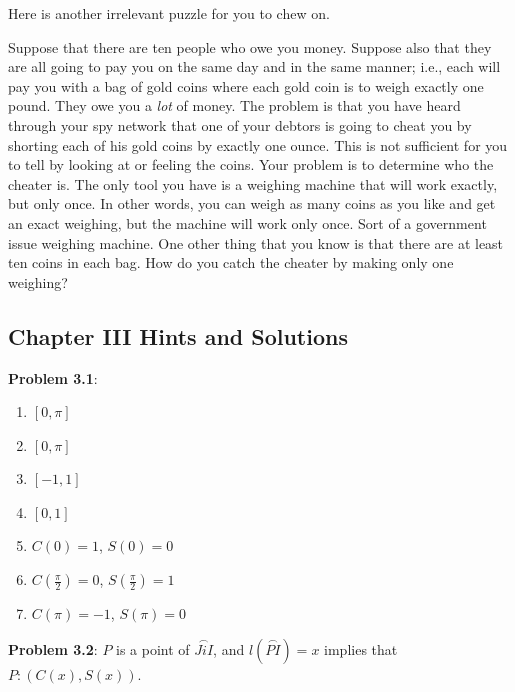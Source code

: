\documentclass[english]{book}
\newcommand{\arc}[1]{\overset{\frown}{#1} }
\begin{document}
\vspace{0.3cm}

Here is another irrelevant puzzle for you to chew on.

Suppose that there are ten people who owe you money. Suppose also that they are all going to pay you on the same day and in the same manner; i.e., each will pay you with a bag of gold coins where each gold coin is to weigh exactly one pound. They owe you a \emph{lot} of money. The problem is that you have heard through your spy network that one of your debtors is going to cheat you by shorting each of his gold coins by exactly one ounce. This is not sufficient for you to tell by looking at or feeling the coins. Your problem is to determine who the cheater is. The only tool you have is a weighing machine that will work exactly, but only once. In other words, you can weigh as many coins as you like and get an exact weighing, but the machine will work only once. Sort of a government issue weighing machine. One other thing that you know is that there are at least ten coins in each bag. How do you catch the cheater by making only one weighing?



\newpage
\begin{center}
\section*{Chapter III Hints and Solutions}
\end{center}


\textbf{Problem 3.1}:
\begin{enumerate}[\hspace{1cm}a)]
  \item $[0, \pi]$
  \item $[0, \pi]$
  \item $[-1, 1]$
  \item $[0,1]$
  \item $C(0) = 1$, $S(0) = 0$
  \item $C(\frac{\pi}{2}) = 0$, $S(\frac{\pi}{2}) = 1$
  \item $C(\pi) = -1$, $S(\pi) = 0$
\end{enumerate}

\textbf{Problem 3.2}: $P$ is a point of $\arc{JiI}$, and $l(\arc{PI}) = x$ implies that $P:(C(x),S(x))$.

\vspace{0.3cm}
\end{document}
